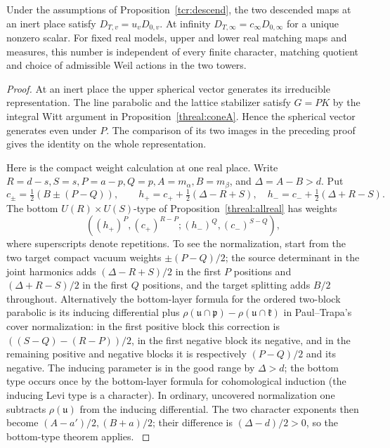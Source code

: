 \begin{proposition}\label{tcr:unique}
Under the assumptions of Proposition~\ref{tcr:descend}, the two
descended maps at an inert place satisfy \(D_{T,v}=u_vD_{0,v}\).
At infinity \(D_{T,\infty}=c_\infty D_{0,\infty}\) for a unique
nonzero scalar. For fixed real models, upper and lower real
matching maps and measures, this number is independent of every
finite character, matching quotient and choice of admissible
Weil actions in the two towers.
\end{proposition}
\begin{proof}
At an inert place the upper spherical vector generates its
irreducible representation. The line parabolic and the lattice
stabilizer satisfy \(G=PK\) by the integral Witt argument in
Proposition~\ref{threal:coneA}. Hence the spherical vector generates
even under \(P\). The comparison of its two images in the preceding
proof gives the identity on the whole representation.

Here is the compact weight calculation at one real place.
Write \(R=d-s,S=s,P=a-p,Q=p,A=m_\alpha,B=m_\beta\), and
\(\Delta=A-B>d\). Put
\[
 c_\pm=\tfrac12(B\pm(P-Q)),\qquad
 h_+=c_++\tfrac12(\Delta-R+S),\quad
 h_-=c_-+\tfrac12(\Delta+R-S).
\]
The bottom \(U(R)\times U(S)\)-type of
Proposition~\ref{threal:allreal} has weights
\[
 ((h_+)^P,(c_+)^{R-P};(h_-)^Q,(c_-)^{S-Q}),
\]
where superscripts denote repetitions. To see the normalization,
start from the two target compact vacuum weights \(\pm(P-Q)/2\);
the source determinant in the joint harmonics adds
\((\Delta-R+S)/2\) in the first \(P\) positions and
\((\Delta+R-S)/2\) in the first \(Q\) positions, and the target
splitting adds \(B/2\) throughout.
Alternatively the bottom-layer formula for the ordered two-block
parabolic is its inducing differential plus
\(\rho(\mathfrak u\cap\mathfrak p)-\rho(\mathfrak u\cap\mathfrak k)\)
in Paul--Trapa's cover normalization: in the first positive block
this correction is \(((S-Q)-(R-P))/2\), in the first negative
block its negative, and in the remaining positive and negative
blocks it is respectively \((P-Q)/2\) and its negative.
The inducing parameter is in the good range by \(\Delta>d\);
the bottom type occurs once by the bottom-layer formula for
cohomological induction (the inducing Levi type is a character).
In ordinary, uncovered normalization one subtracts \(\rho(\mathfrak u)\)
from the inducing differential. The two character exponents then
become \((A-a')/2,(B+a)/2\); their difference is
\((\Delta-d)/2>0\), so the bottom-type theorem applies.
\cite[\S2 and Theorem~4.1]{paulTrapaHowe}
\cite[Theorem~5.3 and Proposition~6.1]{voganZuckerman}


\end{proof}
